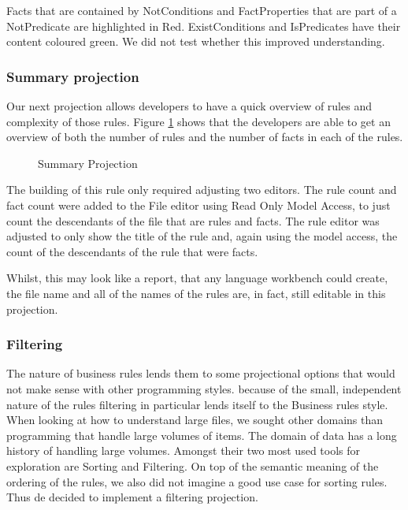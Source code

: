 Facts that are contained by NotConditions and FactProperties that are part of a NotPredicate are highlighted in Red.
ExistConditions and IsPredicates have their content coloured green.
We did not test whether this improved understanding.

\subsubsection{Summary projection}
Our next projection allows developers to have a quick overview of rules and complexity of those rules.
Figure \ref{fig:summaryProjection} shows that the developers are able to get an overview of both the number of rules and the number of facts in each of the rules.

\begin{figure}[h]
    \centering
    \caption{Summary Projection}
    \label{fig:summaryProjection}
\end{figure}

The building of this rule only required adjusting two editors.
The rule count and fact count were added to the File editor using Read Only Model Access, to just count the descendants of the file that are rules and facts.
The rule editor was adjusted to only show the title of the rule and, again using the model access, the count of the descendants of the rule that were facts.

Whilst, this may look like a report, that any language workbench could create, the file name and all of the names of the rules are, in fact, still editable in this projection.

\subsubsection{Filtering}
The nature of business rules lends them to some projectional options that would not make sense with other programming styles.
because of the small, independent nature of the rules filtering in particular lends itself to the Business rules style.
When looking at how to understand large files, we sought other domains than programming that handle large volumes of items.
The domain of data has a long history of handling large volumes.
Amongst their two most used tools for exploration are Sorting and Filtering.
On top of the semantic meaning of the ordering of the rules, we also did not imagine a good use case for sorting rules.
Thus de decided to implement a filtering projection.

